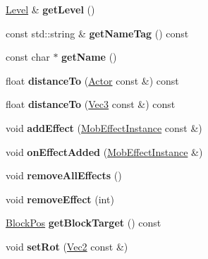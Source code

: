 \begin{DoxyCompactItemize}
\mbox{\hyperlink{struct_level}{Level}} \& {\bfseries get\+Level} ()
\item 
\mbox{\label{struct_actor_a674fd7e4d902f6ae345e801f3b72961c}} 
const std\+::string \& {\bfseries get\+Name\+Tag} () const
\item 
\mbox{\label{struct_actor_ab8435a1d0318ddc5e9a9c68f7754c8c4}} 
const char $\ast$ {\bfseries get\+Name} ()
\item 
\mbox{\label{struct_actor_af7cb2fcf402486ce353d3fd9f9de1c14}} 
float {\bfseries distance\+To} (\mbox{\hyperlink{struct_actor}{Actor}} const \&) const
\item 
\mbox{\label{struct_actor_aa53edf2bf61a587d8d79f01644f72fa8}} 
float {\bfseries distance\+To} (\mbox{\hyperlink{struct_vec3}{Vec3}} const \&) const
\item 
\mbox{\label{struct_actor_a6709ba4eae2256c7e1008a4d2e6761f7}} 
void {\bfseries add\+Effect} (\mbox{\hyperlink{struct_mob_effect_instance}{Mob\+Effect\+Instance}} const \&)
\item 
\mbox{\label{struct_actor_a930d306e9fa8775362989a8a50216471}} 
void {\bfseries on\+Effect\+Added} (\mbox{\hyperlink{struct_mob_effect_instance}{Mob\+Effect\+Instance}} \&)
\item 
\mbox{\label{struct_actor_ac02961a461411c12f2749352020187e9}} 
void {\bfseries remove\+All\+Effects} ()
\item 
\mbox{\label{struct_actor_a1b40cabe6737778e5c43d42c889f2e4c}} 
void {\bfseries remove\+Effect} (int)
\item 
\mbox{\label{struct_actor_a591daaf60e26651d7c1fe9bbfe18ff43}} 
\mbox{\hyperlink{struct_block_pos}{Block\+Pos}} {\bfseries get\+Block\+Target} () const
\item 
\mbox{\label{struct_actor_a00ecde3d0c92e56d11072002cf579734}} 
void {\bfseries set\+Rot} (\mbox{\hyperlink{struct_vec2}{Vec2}} const \&)
\item 
\mbox{\label{struct_actor_a65e2bc43e6bf4cac8c97f8e5d68146ab}} 

\end{DoxyCompactItemize}
